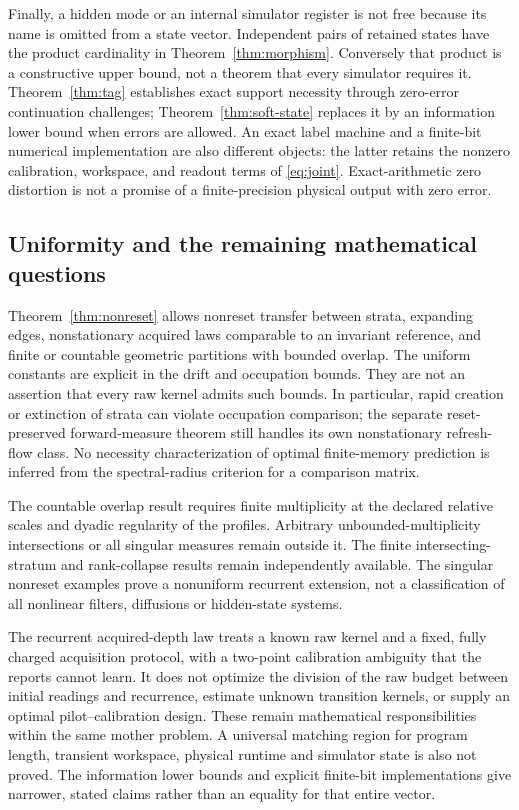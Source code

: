 Finally, a hidden mode or an internal simulator register is not free because its name is omitted from a state vector. Independent pairs of retained states have the product cardinality in Theorem~\ref{thm:morphism}. Conversely that product is a constructive upper bound, not a theorem that every simulator requires it. Theorem~\ref{thm:tag} establishes exact support necessity through zero-error continuation challenges; Theorem~\ref{thm:soft-state} replaces it by an information lower bound when errors are allowed. An exact label machine and a finite-bit numerical implementation are also different objects: the latter retains the nonzero calibration, workspace, and readout terms of \eqref{eq:joint}. Exact-arithmetic zero distortion is not a promise of a finite-precision physical output with zero error.


\subsection{Uniformity and the remaining mathematical questions}
Theorem~\ref{thm:nonreset} allows nonreset transfer between strata, expanding edges, nonstationary acquired laws comparable to an invariant reference, and finite or countable geometric partitions with bounded overlap. The uniform constants are explicit in the drift and occupation bounds. They are not an assertion that every raw kernel admits such bounds. In particular, rapid creation or extinction of strata can violate occupation comparison; the separate reset-preserved forward-measure theorem still handles its own nonstationary refresh-flow class. No necessity characterization of optimal finite-memory prediction is inferred from the spectral-radius criterion for a comparison matrix.

The countable overlap result requires finite multiplicity at the declared relative scales and dyadic regularity of the profiles. Arbitrary unbounded-multiplicity intersections or all singular measures remain outside it. The finite intersecting-stratum and rank-collapse results remain independently available. The singular nonreset examples prove a nonuniform recurrent extension, not a classification of all nonlinear filters, diffusions or hidden-state systems.

The recurrent acquired-depth law treats a known raw kernel and a fixed, fully charged acquisition protocol, with a two-point calibration ambiguity that the reports cannot learn. It does not optimize the division of the raw budget between initial readings and recurrence, estimate unknown transition kernels, or supply an optimal pilot--calibration design. These remain mathematical responsibilities within the same mother problem. A universal matching region for program length, transient workspace, physical runtime and simulator state is also not proved. The information lower bounds and explicit finite-bit implementations give narrower, stated claims rather than an equality for that entire vector.

